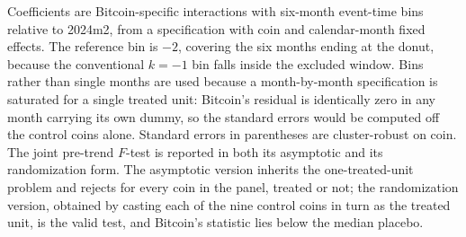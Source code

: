 \begin{table}[t]
\begin{threeparttable}
\begin{tablenotes}[flushleft]
\item Coefficients are Bitcoin-specific interactions with six-month event-time bins relative to 2024m2, from a specification with coin and calendar-month fixed effects. The reference bin is $-2$, covering the six months ending at the donut, because the conventional $k=-1$ bin falls inside the excluded window. Bins rather than single months are used because a month-by-month specification is saturated for a single treated unit: Bitcoin's residual is identically zero in any month carrying its own dummy, so the standard errors would be computed off the control coins alone. Standard errors in parentheses are cluster-robust on coin. The joint pre-trend $F$-test is reported in both its asymptotic and its randomization form. The asymptotic version inherits the one-treated-unit problem and rejects for every coin in the panel, treated or not; the randomization version, obtained by casting each of the nine control coins in turn as the treated unit, is the valid test, and Bitcoin's statistic lies below the median placebo.
\end{tablenotes}
\end{threeparttable}
\end{table}
